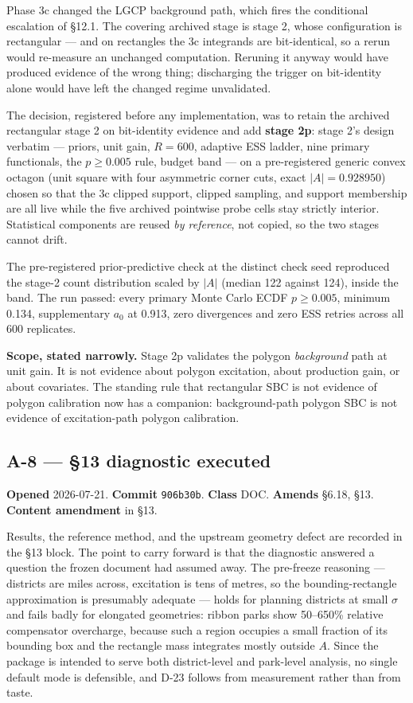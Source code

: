 \documentclass[
  10pt,
]{article}
\begin{document}
Phase 3c changed the LGCP background path, which fires the conditional escalation of §12.1. The covering archived stage is stage 2, whose configuration is rectangular --- and on rectangles the 3c integrands are bit-identical, so a rerun would re-measure an unchanged computation. Reruning it anyway would have produced evidence of the wrong thing; discharging the trigger on bit-identity alone would have left the changed regime unvalidated.

The decision, registered before any implementation, was to retain the archived rectangular stage 2 on bit-identity evidence and add \textbf{stage 2p}: stage 2's design verbatim --- priors, unit gain, \(R = 600\), adaptive ESS ladder, nine primary functionals, the \(p \geq 0.005\) rule, budget band --- on a pre-registered generic convex octagon (unit square with four asymmetric corner cuts, exact \(|A| = 0.928950\)) chosen so that the 3c clipped support, clipped sampling, and support membership are all live while the five archived pointwise probe cells stay strictly interior. Statistical components are reused \emph{by reference}, not copied, so the two stages cannot drift.

The pre-registered prior-predictive check at the distinct check seed reproduced the stage-2 count distribution scaled by \(|A|\) (median 122 against 124), inside the band. The run passed: every primary Monte Carlo ECDF \(p \geq 0.005\), minimum 0.134, supplementary \(a_0\) at 0.913, zero divergences and zero ESS retries across all 600 replicates.

\textbf{Scope, stated narrowly.} Stage 2p validates the polygon \emph{background} path at unit gain. It is not evidence about polygon excitation, about production gain, or about covariates. The standing rule that rectangular SBC is not evidence of polygon calibration now has a companion: background-path polygon SBC is not evidence of excitation-path polygon calibration.

\hypertarget{a-8}{%
\subsection{A-8 --- §13 diagnostic executed}\label{a-8}}

\textbf{Opened} 2026-07-21. \textbf{Commit} \texttt{906b30b}. \textbf{Class} DOC. \textbf{Amends} §6.18, §13. \textbf{Content amendment} in §13.

Results, the reference method, and the upstream geometry defect are recorded in the §13 block. The point to carry forward is that the diagnostic answered a question the frozen document had assumed away. The pre-freeze reasoning --- districts are miles across, excitation is tens of metres, so the bounding-rectangle approximation is presumably adequate --- holds for planning districts at small \(\sigma\) and fails badly for elongated geometries: ribbon parks show 50--650\% relative compensator overcharge, because such a region occupies a small fraction of its bounding box and the rectangle mass integrates mostly outside \(A\). Since the package is intended to serve both district-level and park-level analysis, no single default mode is defensible, and D-23 follows from measurement rather than from taste.
\end{document}
